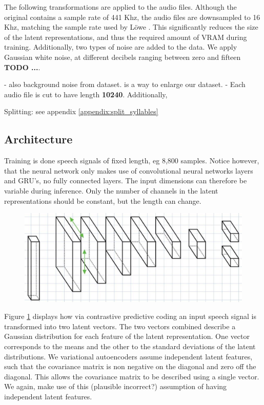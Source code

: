 		The following transformations are applied to the audio files. Although the original contains a sample rate of 441 Khz, the audio files are downsampled to 16 Khz, matching the sample rate used by Löwe \cite{lowePuttingEndEndtoEnd2020}. This significantly reduces the size of the latent representations, and thus the required amount of VRAM during training. Additionally, two types of noise are added to the data. We apply Gaussian white noise, at different decibels ranging between zero and fifteen \textbf{TODO ...}.
		
		- also background noise from dataset. is a way to enlarge our dataset. 
		- Each audio file is cut to have length \textbf{10240}. Additionally, 
		
		
		Splitting: see appendix  \ref{appendix:split_syllables}
		
	\subsection{Architecture}
			Training is done speech signals of fixed length, eg 8,800 samples. Notice however, that the neural network only makes use of convolutional neural networks layers and GRU's, no fully connected layers. The input dimensions can therefore be variable during inference. Only the number of channels in the latent representations should be constant, but the length can change.
			
		\begin{figure}[h]
			\centering
			\includegraphics[width=0.7\linewidth]{architecture}
			\caption{}
			\label{fig:architecture}
		\end{figure}
	
		Figure \ref{fig:architecture} displays how via contrastive predictive coding an input speech signal is transformed into two latent vectors. The two vectors combined describe a Gaussian distribution for each feature of the latent representation. One vector corresponds to the means and the other to the standard deviations of the latent distributions. We variational autoencoders assume independent latent features, such that the covariance matrix is non negative on the diagonal and zero off the diagonal. This allows the covariance matrix to be described using a single vector. We again, make use of this (plausible incorrect?) assumption of having independent latent features.




